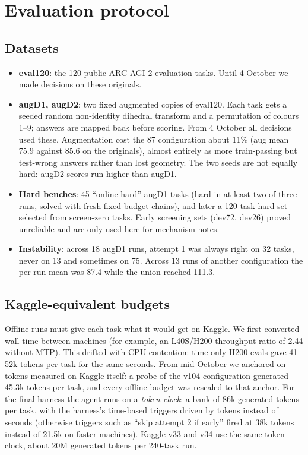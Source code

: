 \section{Evaluation protocol}\label{app:eval}

\subsection{Datasets}
\begin{itemize}
\item \textbf{eval120}: the 120 public ARC-AGI-2 evaluation tasks. Until 4 October we made decisions on these originals.
\item \textbf{augD1, augD2}: two fixed augmented copies of eval120. Each task gets a seeded random non-identity dihedral transform and a permutation of colours 1--9; answers are mapped back before scoring. From 4 October all decisions used these. Augmentation cost the 87 configuration about 11\% (aug mean 75.9 against 85.6 on the originals), almost entirely as more train-passing but test-wrong answers rather than lost geometry. The two seeds are not equally hard: augD2 scores run higher than augD1.
\item \textbf{Hard benches}: 45 ``online-hard'' augD1 tasks (hard in at least two of three runs, solved with fresh fixed-budget chains), and later a 120-task hard set selected from screen-zero tasks. Early screening sets (dev72, dev26) proved unreliable and are only used here for mechanism notes.
\item \textbf{Instability}: across 18 augD1 runs, attempt 1 was always right on 32 tasks, never on 13 and sometimes on 75. Across 13 runs of another configuration the per-run mean was 87.4 while the union reached 111.3.
\end{itemize}

\subsection{Kaggle-equivalent budgets}
Offline runs must give each task what it would get on Kaggle. We first converted wall time between machines (for example, an L40S/H200 throughput ratio of 2.44 without MTP). This drifted with CPU contention: time-only H200 evals gave 41--52k tokens per task for the same seconds. From mid-October we anchored on tokens measured on Kaggle itself: a probe of the v104 configuration generated 45.3k tokens per task, and every offline budget was rescaled to that anchor. For the final harness the agent runs on a \emph{token clock}: a bank of 86k generated tokens per task, with the harness's time-based triggers driven by tokens instead of seconds (otherwise triggers such as ``skip attempt 2 if early'' fired at 38k tokens instead of 21.5k on faster machines). Kaggle v33 and v34 use the same token clock, about 20M generated tokens per 240-task run.

